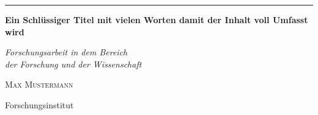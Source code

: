 \begin{titlepage} %


    \rule{1pt}{\textheight} %
    \hspace{0.05\textwidth} %
    \parbox[b]{0.97\textwidth}{ %
        \RaggedRight %

        {\fontsize{23pt}{23pt}\selectfont\textbf{Ein Schlüssiger Titel mit vielen Worten damit der Inhalt voll Umfasst wird}
        \par}
        \bigskip
        {\large\textit{Forschungsarbeit in dem Bereich \\ der Forschung und der Wissenschaft}\par} %
        \bigskip
        {\large\textsc{Max Mustermann}\par} %

        \vspace{0.25\textheight} %

        {\noindent Forschungsinstitut} %
        \bigskip
    }


    \afterpage{
        \null
        \thispagestyle{empty}
        \newpage
    }

\end{titlepage}
